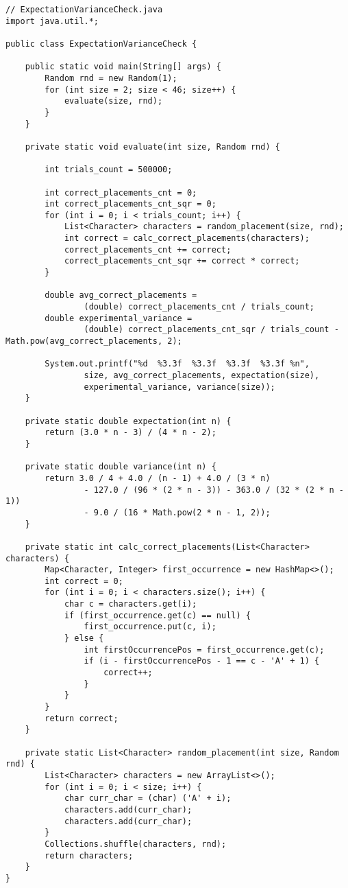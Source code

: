 \documentclass{article}
\begin{document}
\begin{lstlisting}
// ExpectationVarianceCheck.java
import java.util.*;

public class ExpectationVarianceCheck {

	public static void main(String[] args) {
		Random rnd = new Random(1);
		for (int size = 2; size < 46; size++) {
			evaluate(size, rnd);
		}
	}

	private static void evaluate(int size, Random rnd) {

		int trials_count = 500000;

		int correct_placements_cnt = 0;
		int correct_placements_cnt_sqr = 0;
		for (int i = 0; i < trials_count; i++) {
			List<Character> characters = random_placement(size, rnd);
			int correct = calc_correct_placements(characters);
			correct_placements_cnt += correct;
			correct_placements_cnt_sqr += correct * correct;
		}

		double avg_correct_placements =
				(double) correct_placements_cnt / trials_count;
		double experimental_variance =
				(double) correct_placements_cnt_sqr / trials_count - Math.pow(avg_correct_placements, 2);

		System.out.printf("%d  %3.3f  %3.3f  %3.3f  %3.3f %n",
				size, avg_correct_placements, expectation(size),
				experimental_variance, variance(size));
	}

	private static double expectation(int n) {
		return (3.0 * n - 3) / (4 * n - 2);
	}

	private static double variance(int n) {
		return 3.0 / 4 + 4.0 / (n - 1) + 4.0 / (3 * n)
				- 127.0 / (96 * (2 * n - 3)) - 363.0 / (32 * (2 * n - 1))
				- 9.0 / (16 * Math.pow(2 * n - 1, 2));
	}

	private static int calc_correct_placements(List<Character> characters) {
		Map<Character, Integer> first_occurrence = new HashMap<>();
		int correct = 0;
		for (int i = 0; i < characters.size(); i++) {
			char c = characters.get(i);
			if (first_occurrence.get(c) == null) {
				first_occurrence.put(c, i);
			} else {
				int firstOccurrencePos = first_occurrence.get(c);
				if (i - firstOccurrencePos - 1 == c - 'A' + 1) {
					correct++;
				}
			}
		}
		return correct;
	}

	private static List<Character> random_placement(int size, Random rnd) {
		List<Character> characters = new ArrayList<>();
		for (int i = 0; i < size; i++) {
			char curr_char = (char) ('A' + i);
			characters.add(curr_char);
			characters.add(curr_char);
		}
		Collections.shuffle(characters, rnd);
		return characters;
	}
}
\end{lstlisting}
\end{document}
